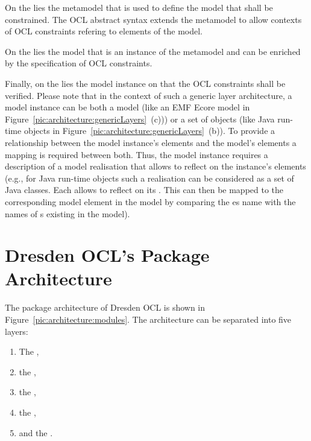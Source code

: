 On the  lies 
the metamodel that is used to define the model that shall be constrained. The
\acs{OCL} abstract syntax extends the metamodel to allow contexts of \acs{OCL}
constraints refering to elements of the model.

On the  lies the model that is an instance of the metamodel
and can be enriched by the specification of \acs{OCL} constraints. 

Finally, on the  lies the model instance on that the 
\acs{OCL} constraints shall be verified. Please note that in the context of 
such a generic layer architecture, a model instance can be both a model (like an
\acs{EMF} Ecore model in Figure~\ref{pic:architecture:genericLayers}~(c))) or a
set of objects (like Java run-time objects in
Figure~\ref{pic:architecture:genericLayers}~(b)). To provide a relationship
between the model instance's elements and the model's elements a mapping is
required between both. Thus, the model instance requires a description of a
model realisation that allows to reflect on the instance's elements (e.g., for
Java run-time objects such a realisation can be considered as a set of Java
classes. Each  allows to reflect on its
. This  can then be mapped to the
corresponding model element in the model by comparing the es name
with the names of s existing in the model).



\section{Dresden OCL's Package Architecture}

The package architecture of Dresden OCL is shown in
Figure~\ref{pic:architecture:modules}. The architecture can be separated into
five layers: 

\begin{enumerate}
  \item The ,
  \item the ,
  \item the ,
  \item the ,
  \item and the .
\end{enumerate}

